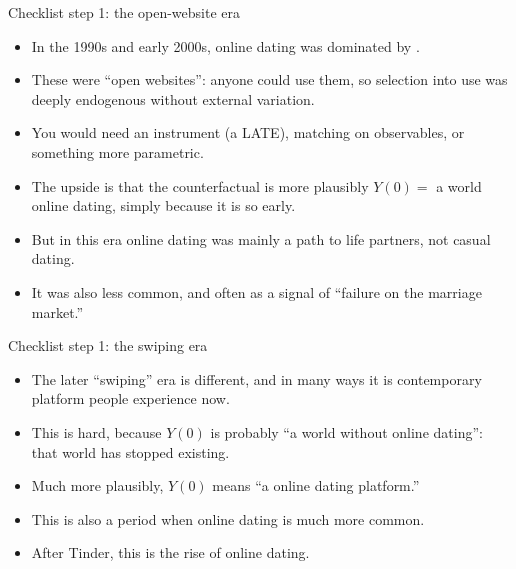 \documentclass[aspectratio=169,11pt]{beamer}
\begin{document}
\begin{frame}[shrink=5]{Checklist step 1: the open-website era}
\vspace{0.2em}
\begin{itemize}\small\setlength\itemsep{0.45em}
  \item In the 1990s and early 2000s, online dating was dominated by .
  \item These were ``open websites'': anyone could use them, so selection into use was deeply endogenous without external variation.
  \item You would need an instrument (a LATE), matching on observables, or something more parametric.
  \item The upside is that the counterfactual is more plausibly $Y(0) =$ a world  online dating, simply because it is so early.
  \item But in this era online dating was mainly a path to life partners, not casual dating.
  \item It was also less common, and often  as a signal of ``failure on the marriage market.''
\end{itemize}
\end{frame}

\begin{frame}[shrink=3]{Checklist step 1: the swiping era}
\vspace{0.2em}
\begin{itemize}\small\setlength\itemsep{0.5em}
  \item The later ``swiping'' era is different, and in many ways it is  contemporary platform people experience now.
  \item This is hard, because $Y(0)$ is probably  ``a world without online dating'': that world has stopped existing.
  \item Much more plausibly, $Y(0)$ means ``a  online dating platform.''
  \item This is also a period when online dating is much more common.
  \item After Tinder, this is the rise of  online dating.
\end{itemize}
\end{frame}
\end{document}
